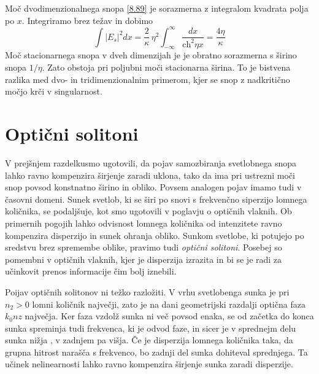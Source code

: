 Moč dvodimenzionalnega snopa \ref{8.89} je sorazmerna z integralom
kvadrata polja po $x.$ Integriramo brez težav in dobimo 
\begin{equation}
\int|E_{s}|^{2}dx=\frac{2}{\kappa}\,\eta^{2}\int_{-\infty}^{\infty}\frac{dx}{\text{ch}^{2}\eta x}=\frac{4\eta}{\kappa}
\end{equation}
 Moč stacionarnega snopa v dveh dimenzijah je je obratno sorazmerna
s širino snopa $1/\eta$. Zato obstoja pri poljubni moči stacionarna
širina. To je bistvena razlika med dvo- in tridimenzionalnim primerom,
kjer se snop z nadkritično močjo krči v singularnost.


\section{Optični solitoni}

V prejšnjem razdelkusmo ugotovili, da pojav samozbiranja svetlobnega
snopa lahko ravno kompenzira širjenje zaradi uklona, tako da ima pri
ustrezni moči snop povsod konstnatno širino in obliko. Povsem analogen
pojav imamo tudi v časovni domeni. Sunek svetlob, ki se širi po snovi
s frekvenčno siperzijo lomnega količnika, se podaljšuje, kot smo ugotovili
v poglavju o optičnih vlaknih. Ob primernih pogojih lahko odvisnost
lomnega količnika od intenzitete ravno kompenzira disperzijo in sunek
ohranja obliko. Sunkom svetlobe, ki potujejo po sredstvu brez spremembe
oblike, pravimo tudi \textit{optični solitoni}. Posebej so pomembni
v optičnih vlaknih, kjer je disperzija izrazita in bi se je radi za
učinkovit prenos informacije čim bolj iznebili.

Poijav optičnih solitonov ni težko razložiti. V vrhu svetlobenga sunka
je pri $n_{2}>0$ lomni količnik največji, zato je na dani geometrijski
razdalji optična faza $k_{0}nz$ največja. Ker faza vzdolž sunka ni
več povsod enaka, se od začetka do konca sunka spreminja tudi frekvenca,
ki je odvod faze, in sicer je v sprednejm delu sunka nižja , v zadnjem
pa višja. Če je disperzija lomnega količnika taka, da grupna hitrost
narašča s frekvenco, bo zadnji del sunka dohiteval sprednjega. Ta
učinek nelinearnosti lahko ravno kompenzira širjenje sunka zaradi
disperzije.

